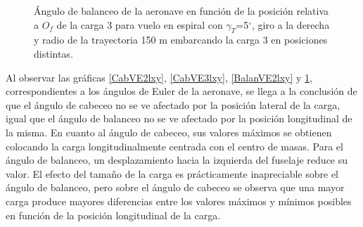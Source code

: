 \begin{figure}
	\centering
	\caption{Ángulo de balanceo de la aeronave en función de la posición relativa a $O_f$ de la carga 3 para vuelo en espiral con $\gamma_T$=5$^\circ$, giro a la derecha y radio de la trayectoria 150 m embarcando la carga 3 en posiciones distintas.}
	\label{BalanVE3lxy}
\end{figure}

Al observar las gráficas \ref{CabVE2lxy}, \ref{CabVE3lxy}, \ref{BalanVE2lxy} y \ref{BalanVE3lxy}, correspondientes a los ángulos de Euler de la aeronave, se llega a la conclusión de que el ángulo de cabeceo no se ve afectado por la posición lateral de la carga, igual que el ángulo de balanceo no se ve afectado por la posición longitudinal de la misma.
En cuanto al ángulo de cabeceo, sus valores máximos se obtienen colocando la carga longitudinalmente centrada con el centro de masas. Para el ángulo de balanceo, un desplazamiento hacia la izquierda del fuselaje reduce su valor.
El efecto del tamaño de la carga es prácticamente inapreciable sobre el ángulo de balanceo, pero sobre el ángulo de cabeceo se observa que una mayor carga produce mayores diferencias entre los valores máximos y mínimos posibles en función de la posición longitudinal de la carga.

